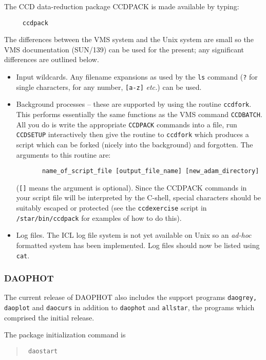 The CCD data-reduction package CCDPACK is made available
by typing:
\begin{verbatim}
     ccdpack
\end{verbatim}
The differences between
the VMS system and the Unix system are small so the VMS documentation
(SUN/139) can be used for the present; any significant differences are
outlined below.
\begin{itemize}
\item Input wildcards. Any filename expansions as
used by the {\tt ls} command ({\tt ?} for single characters, {\tt*} for any
number, {\tt[a-z]} {\sl etc.}) can be used.

\item Background processes -- these are supported by using the routine
{\tt ccdfork}. This performs essentially the same functions as
the VMS command {\tt CCDBATCH}. All you do is write
the appropriate {\tt CCDPACK} commands into a file, run {\tt CCDSETUP}
interactively then give the routine to {\tt ccdfork} which produces a
script which can be forked (nicely into the background) and
forgotten. The arguments to this routine are:
\begin{verbatim}
       name_of_script_file [output_file_name] [new_adam_directory]
\end{verbatim}
({\tt []} means the argument is optional).
Since the CCDPACK commands in your script file will be
interpreted by the C-shell, special characters should be
suitably escaped or protected (see the {\tt ccdexercise} script in
{\tt /star/bin/ccdpack} for examples of how to do this).

\item Log files. The ICL log file system is not yet available on Unix
so an {\sl ad-hoc\/} formatted system has been implemented. Log files
should now be listed using {\tt cat}.
\end{itemize}

\subsubsection{DAOPHOT}

The current release of DAOPHOT also includes the support programs {\tt daogrey,
daoplot} and {\tt daocurs} in addition to {\tt daophot} and {\tt allstar},
the programs which comprised the initial release.

The package initialization command is
\begin{quote}\tt
daostart
\end{quote}

